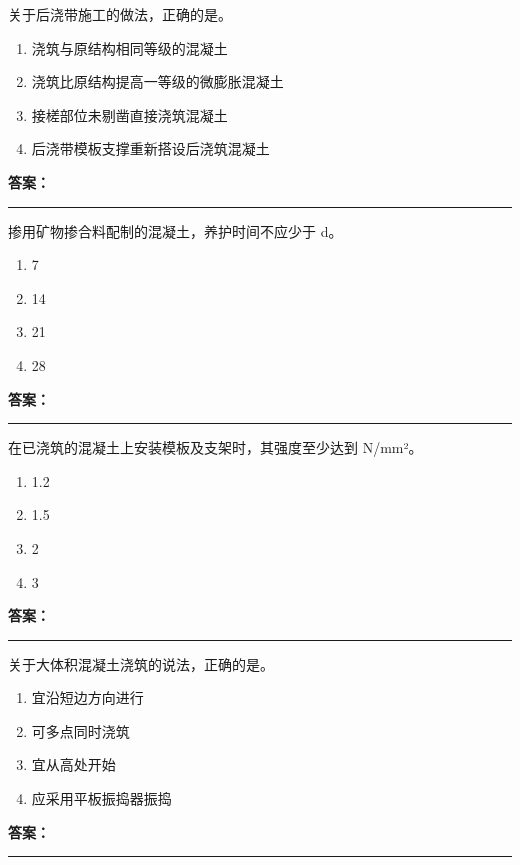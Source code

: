 \documentclass[UTF8,fontset=fandol,11pt]{ctexart}
\newcommand{\answerline}{\textcolor{answerred}{\rule{2.4cm}{0.7pt}}}
\begin{document}
\vspace{0.2em}

\begin{quizbox}[title={第 78 题}]
关于后浇带施工的做法，正确的是。\\
\begin{enumerate}[label=\Alph*.]
\item 浇筑与原结构相同等级的混凝土
\item 浇筑比原结构提高一等级的微膨胀混凝土
\item 接槎部位未剔凿直接浇筑混凝土
\item 后浇带模板支撑重新搭设后浇筑混凝土
\end{enumerate}
\textbf{\textcolor{answerred}{答案：}} \answerline
\end{quizbox}

\vspace{0.2em}

\begin{quizbox}[title={第 79 题}]
掺用矿物掺合料配制的混凝土，养护时间不应少于 d。\\
\begin{enumerate}[label=\Alph*.]
\item 7
\item 14
\item 21
\item 28
\end{enumerate}
\textbf{\textcolor{answerred}{答案：}} \answerline
\end{quizbox}

\vspace{0.2em}

\begin{quizbox}[title={第 80 题}]
在已浇筑的混凝土上安装模板及支架时，其强度至少达到 N/mm²。\\
\begin{enumerate}[label=\Alph*.]
\item 1.2
\item 1.5
\item 2
\item 3
\end{enumerate}
\textbf{\textcolor{answerred}{答案：}} \answerline
\end{quizbox}

\vspace{0.2em}

\begin{quizbox}[title={第 81 题}]
关于大体积混凝土浇筑的说法，正确的是。\\
\begin{enumerate}[label=\Alph*.]
\item 宜沿短边方向进行
\item 可多点同时浇筑
\item 宜从高处开始
\item 应采用平板振捣器振捣
\end{enumerate}
\textbf{\textcolor{answerred}{答案：}} \answerline
\end{quizbox}
\end{document}
